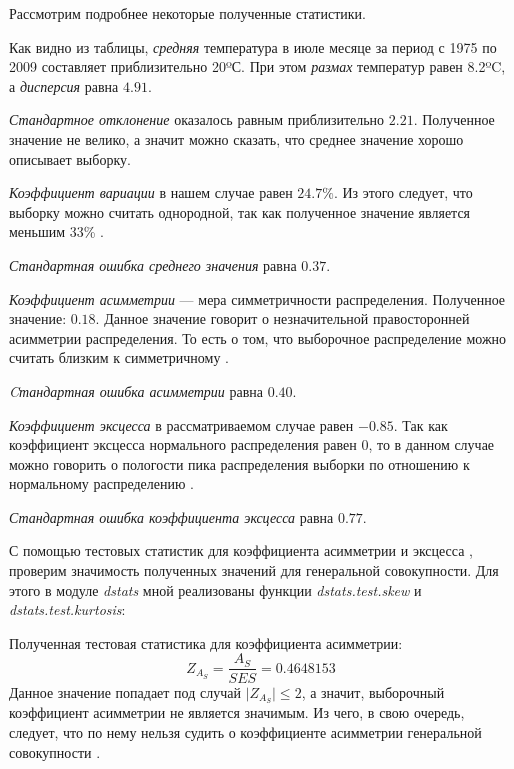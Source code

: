 

Рассмотрим подробнее некоторые полученные статистики.

Как видно из таблицы, \textit{средняя} температура в июле месяце за период с 1975 по 2009 составляет приблизительно 20ºС. При этом \textit{размах} температур равен 8.2ºC, а \textit{дисперсия} равна $4.91$.

\textit{Стандартное отклонение} оказалось равным приблизительно $2.21$. Полученное значение не велико, а значит можно сказать, что среднее значение хорошо описывает выборку.

\textit{Коэффициент вариации} в нашем случае равен $24.7\%$. Из этого следует, что выборку можно считать однородной, так как полученное значение является меньшим 33\% \cite{Eliseeva1995}.

\textit{Стандартная ошибка среднего значения} равна $0.37$.

\textit{Коэффициент асимметрии} --- мера симметричности распределения. Полученное значение: $0.18$. Данное значение говорит о незначительной правосторонней асимметрии распределения. То есть о том, что выборочное распределение можно считать близким к симметричному \cite{Bulmer1979Principles}.

\textit{Cтандартная ошибка асимметрии} равна $0.40$.

\textit{Коэффициент эксцесса} в рассматриваемом случае равен $-0.85$. Так как коэффициент эксцесса нормального распределения равен $0$, то в данном случае можно говорить о пологости пика распределения выборки по отношению к нормальному распределению \cite{Bulmer1979Principles}.

\textit{Стандартная ошибка коэффициента эксцесса} равна $0.77$.

С помощью тестовых статистик для коэффициента асимметрии и эксцесса \cite[с.85-89]{Cramer1997}, проверим значимость полученных значений для генеральной совокупности. Для этого в модуле \textit{dstats} мной реализованы функции \textit{dstats.test.skew} и \textit{dstats.test.kurtosis}:

Полученная тестовая статистика для коэффициента асимметрии:
\begin{equation*}
	Z_{A_S} = \frac{A_S}{SES} = 0.4648153
\end{equation*}
Данное значение попадает под случай $\vert Z_{A_S} \vert \le 2$, а значит, выборочный коэффициент асимметрии не является значимым. Из чего, в свою очередь, следует, что по нему нельзя судить о коэффициенте асимметрии генеральной совокупности \cite[с.85]{Cramer1997}.

